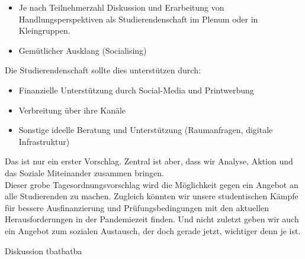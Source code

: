 {\begin{itemize}
                Wissenschaft (zum Beispiel Sozialforschung) oder Schulen und Kindergärten.
            \item Je nach Teilnehmerzahl Diskussion und Erarbeitung von Handlungsperspektiven als
                Studierendenschaft im Plenum oder in Kleingruppen.
            \item Gemütlicher Ausklang (Socialising)
        \end{itemize}
        Die Studierendenschaft sollte dies unterstützen durch:
        \begin{itemize}
            \item Finanzielle Unterstützung durch Social-Media und Printwerbung
            \item Verbreitung über ihre Kanäle
            \item Sonstige ideelle Beratung und Unterstützung (Raumanfragen, digitale Infrastruktur)
        \end{itemize}
        Das ist nur ein erster Vorschlag. Zentral ist aber, dass wir Analyse, Aktion und das Soziale
        Miteinander zusammen bringen.\\
        Dieser grobe Tagesordnungsvorschlag wird die Möglichkeit gegen ein Angebot an alle Studierenden
        zu machen. Zugleich könnten wir unsere studentischen Kämpfe für bessere Ausfinanzierung und
        Prüfungsbedingungen mit den aktuellen Herausforderungen in der Pandemiezeit finden. Und nicht
        zuletzt geben wir auch ein Angebot zum sozialen Austausch, der doch gerade jetzt, wichtiger denn je ist.
    }{
        Diskussion
    }{tba}{tba}{tba}
